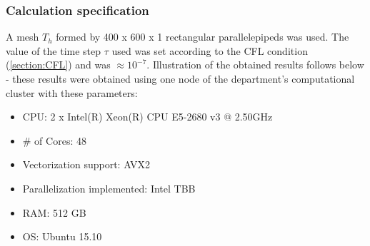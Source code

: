 \subsubsection{Calculation specification}
A mesh $T_h$ formed by 400 x 600 x 1 rectangular parallelepipeds was used.
The value of the time step $\tau$ used was set according to the CFL condition (\ref{section:CFL}) and was $\approx 10^{-7}$.
Illustration of the obtained results follows below - these results were obtained using one node of the department's computational cluster with these parameters:
\begin{itemize}
    \item CPU: 2 x Intel(R) Xeon(R) CPU E5-2680 v3 @ 2.50GHz
    \item \# of Cores: 48
    \item Vectorization support: AVX2
    \item Parallelization implemented: Intel TBB
    \item RAM: 512 GB
    \item OS: Ubuntu 15.10
\end{itemize}

